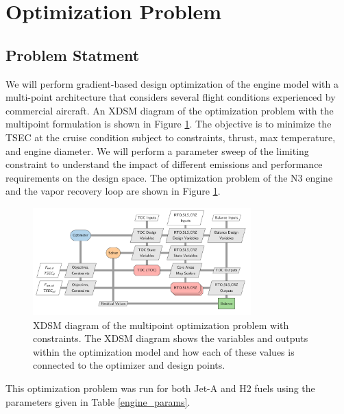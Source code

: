 \documentclass[conf]{new-aiaa}
\begin{document}
\section{Optimization Problem}
\label{sec:optprob}

\subsection{Problem Statment}
We will perform gradient-based design optimization of the engine model with a multi-point architecture that considers several flight conditions experienced by commercial aircraft.
An XDSM diagram of the optimization problem with the multipoint formulation is shown in Figure \ref{fig:N3_xdsm_opt}.
The objective is to minimize the TSEC at the cruise condition subject to constraints, thrust, max temperature, and engine diameter.
We will perform a parameter sweep of the limiting constraint to understand the impact of different emissions and performance requirements on the design space.
The optimization problem of the N3 engine and the vapor recovery loop are shown in Figure \ref{fig:N3_xdsm_opt}.

\begin{figure}[hbt!]
  \centering
  \includegraphics[width=0.75\textwidth]{N3_xdsm_opt.pdf}
  \caption{
    XDSM diagram of the multipoint optimization problem with constraints.
    The XDSM diagram shows the variables and outputs within the optimization model and how each of these values is connected to the optimizer and design points.}
  \label{fig:N3_xdsm_opt}
\end{figure}

This optimization problem was run for both Jet-A and H2 fuels using the parameters given in Table \ref{engine_params}.
\end{document}

